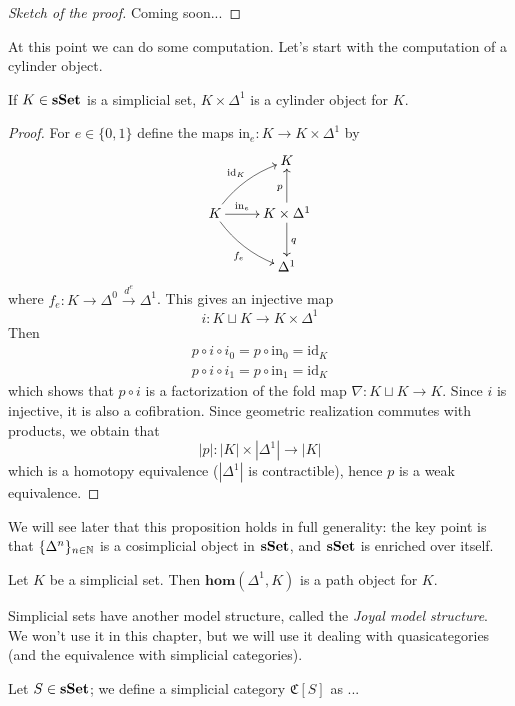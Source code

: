 \begin{refsection}
\begin{proof}[Sketch of the proof]
Coming soon...
\end{proof}

At this point we can do some computation. Let's start with the computation of a cylinder object.

\begin{prop}
If $K \in \mathbf{s\,\!\mathbf{Set}}$ is a simplicial set, $K \times \Delta^1$ is a cylinder object for $K$.
\end{prop}

\begin{proof}
For $e \in \{0,1\}$ define the maps $\mathrm{in}_e \colon K \to K \times \Delta^1$ by
\[
\xymatrix{
& K \\
K \ar@/^.5pc/[ur]^{\mathrm{id}_K} \ar@/_.5pc/[dr]_{f_e} \ar[r]^-{\mathrm{in}_e} & K \times \Delta^1 \ar[u]^p \ar[d]^q \\ & \Delta^1
}
\]
where $f_e \colon K \to \Delta^0 \xrightarrow{d^e} \Delta^1$. This gives an injective map
\[
i \colon K \sqcup K \to K \times \Delta^1
\]
Then
\begin{gather*}
p \circ i \circ i_0 = p \circ \mathrm{in}_0 = \mathrm{id}_K \\
p \circ i \circ i_1 = p \circ \mathrm{in}_1 = \mathrm{id}_K
\end{gather*}
which shows that $p \circ i$ is a factorization of the fold map $\nabla \colon K \sqcup K \to K$. Since $i$ is injective, it is also a cofibration. Since geometric realization commutes with products, we obtain that
\[
|p| \colon |K| \times |\Delta^1| \to |K|
\]
which is a homotopy equivalence ($|\Delta^1|$ is contractible), hence $p$ is a weak equivalence.
\end{proof}

We will see later that this proposition holds in full generality: the key point is that $\{\Delta^n\}_{n \in \mathbb{N}}$ is a cosimplicial object in $\mathbf{s\,\!\mathbf{Set}}$, and $\mathbf{s\,\!\mathbf{Set}}$ is enriched over itself.

\begin{prop}
Let $K$ be a simplicial set. Then $\mathbf{hom}(\Delta^1,K)$ is a path object for $K$.
\end{prop}

Simplicial sets have another model structure, called the \emph{Joyal model structure}. We won't use it in this chapter, but we will use it dealing with quasicategories (and the equivalence with simplicial categories).

\begin{defin}
Let $S \in \mathbf{s\,\!\mathbf{Set}}$; we define a simplicial category $\mathfrak C[S]$ as ...
\end{defin}


\end{refsection}
